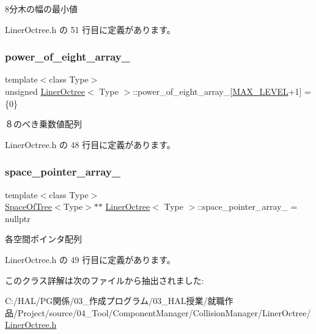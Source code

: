 8分木の幅の最小値 



 Liner\+Octree.\+h の 51 行目に定義があります。

\mbox{\label{class_liner_octree_ab7ddbc8f86cfa3ff46f01f080b56572a}} 
\subsubsection{\texorpdfstring{power\+\_\+of\+\_\+eight\+\_\+array\+\_\+}{power\_of\_eight\_array\_}}
{\footnotesize\ttfamily template$<$class Type$>$ \\
unsigned \mbox{\hyperlink{class_liner_octree}{Liner\+Octree}}$<$ Type $>$\+::power\+\_\+of\+\_\+eight\+\_\+array\+\_\+\mbox{[}\mbox{\hyperlink{class_liner_octree_aced865f2822181486eb805e4db1f0a32}{M\+A\+X\+\_\+\+L\+E\+V\+EL}}+1\mbox{]} = \{0\}\hspace{0.3cm}{\ttfamily [private]}}



８のべき乗数値配列 



 Liner\+Octree.\+h の 48 行目に定義があります。

\mbox{\label{class_liner_octree_a0ffc2effd42779c7f88c4eecc8a68bfb}} 
\subsubsection{\texorpdfstring{space\+\_\+pointer\+\_\+array\+\_\+}{space\_pointer\_array\_}}
{\footnotesize\ttfamily template$<$class Type$>$ \\
\mbox{\hyperlink{class_space_of_tree}{Space\+Of\+Tree}}$<$Type$>$$\ast$$\ast$ \mbox{\hyperlink{class_liner_octree}{Liner\+Octree}}$<$ Type $>$\+::space\+\_\+pointer\+\_\+array\+\_\+ = nullptr\hspace{0.3cm}{\ttfamily [private]}}



各空間ポインタ配列 



 Liner\+Octree.\+h の 49 行目に定義があります。



このクラス詳解は次のファイルから抽出されました\+:\begin{DoxyCompactItemize}
\item 
C\+:/\+H\+A\+L/\+P\+G関係/03\+\_\+作成プログラム/03\+\_\+\+H\+A\+L授業/就職作品/\+Project/source/04\+\_\+\+Tool/\+Component\+Manager/\+Collision\+Manager/\+Liner\+Octree/\mbox{\hyperlink{_liner_octree_8h}{Liner\+Octree.\+h}}\end{DoxyCompactItemize}
